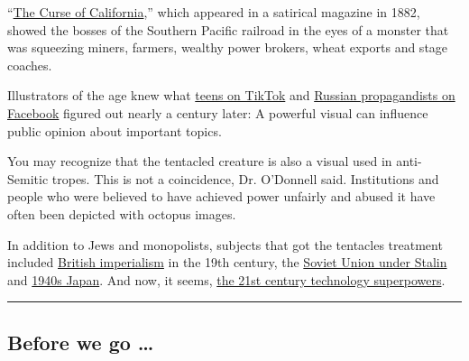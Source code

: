 ``\href{http://nationalhumanitiescenter.org/pds/gilded/power/text1/octopusimages.pdf}{The
Curse of California},'' which appeared in a satirical magazine in 1882,
showed the bosses of the Southern Pacific railroad in the eyes of a
monster that was squeezing miners, farmers, wealthy power brokers, wheat
exports and stage coaches.

Illustrators of the age knew what
\href{https://www.nytimes.com/2020/05/07/style/memers-are-taking-over-tiktok.html}{teens
on TikTok} and
\href{https://www.nytimes.com/2017/11/01/us/politics/russia-2016-election-facebook.html}{Russian
propagandists on Facebook} figured out nearly a century later: A
powerful visual can influence public opinion about important topics.

You may recognize that the tentacled creature is also a visual used in
anti-Semitic tropes. This is not a coincidence, Dr. O'Donnell said.
Institutions and people who were believed to have achieved power
unfairly and abused it have often been depicted with octopus images.

In addition to Jews and monopolists, subjects that got the tentacles
treatment included
\href{https://fineartamerica.com/featured/imperialism-cartoon-1882-granger.html}{British
imperialism} in the 19th century, the
\href{https://www.popsci.com/article/technology/brief-history-octopi-taking-over-world/}{Soviet
Union under Stalin} and
\href{https://digital.library.cornell.edu/catalog/ss:3293931}{1940s
Japan}. And now, it seems,
\href{https://www.esquire.com/news-politics/a15895746/bust-big-tech-silicon-valley}{the
21st century technology superpowers}.

\begin{center}\rule{0.5\linewidth}{\linethickness}\end{center}

\hypertarget{before-we-go-}{%
\subsection{Before we go \ldots{}}\label{before-we-go-}}

